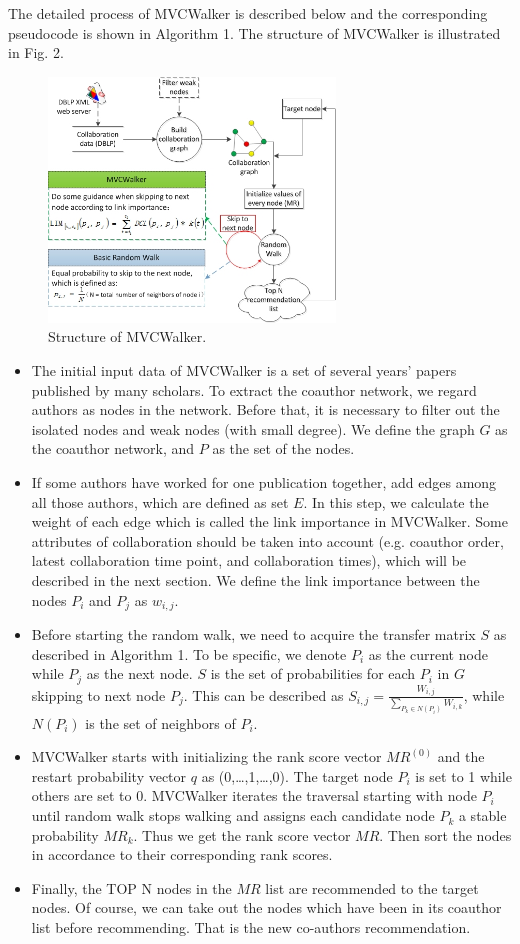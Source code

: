 \documentclass[10pt,journal,compsoc]{IEEEtran}
\begin{document}
The detailed process of MVCWalker is described below and the corresponding pseudocode is shown in Algorithm 1. The structure of MVCWalker is illustrated in Fig. 2.
\begin{figure}
\centering
\includegraphics [width=3in]{Fig2.jpg}
\caption{Structure of MVCWalker.}
\end{figure}
\begin{itemize}
\item The initial input data of MVCWalker is a set of several years' papers published by many scholars. To extract the coauthor network, we regard authors as nodes in the network. Before that, it is necessary to filter out the isolated nodes and weak nodes (with small degree). We define the graph $G$ as the coauthor network, and $P$ as the set of the nodes.
\item If some authors have worked for one publication together, add edges among all those authors, which are defined as set $E$. In this step, we calculate the weight of each edge which is called the link importance in MVCWalker. Some attributes of collaboration should be taken into account (e.g. coauthor order, latest collaboration time point, and collaboration times), which will be described in the next section. We define the link importance between the nodes $P_{i}$ and $P_{j}$ as $w_{i,j}$.
\item Before starting the random walk, we need to acquire the transfer matrix $S$ as described in Algorithm 1. To be specific, we denote $P_{i}$ as the current node while $P_{j}$ as the next node. $S$ is the set of probabilities for each $P_{i}$ in $G$ skipping to next node $P_{j}$. This can be described as $S_{i,j}=\frac{W_{i,j}}{\sum_{P_{k}\in N(P_{i})} W_{i,k}}$, while $N(P_{i})$ is the set of neighbors of $P_{i}$.
\item MVCWalker starts with initializing the rank score vector $MR^{(0)}$ and the restart probability vector $q$ as (0,\ldots,1,\ldots,0). The target node $P_{i}$ is set to 1 while others are set to 0. MVCWalker iterates the traversal starting with node $P_{i}$ until random walk stops walking and assigns each candidate node $P_{k}$ a stable probability $MR_{k}$. Thus we get the rank score vector $MR$. Then sort the nodes in accordance to their corresponding rank scores.
\item Finally, the TOP N nodes in the $MR$ list are recommended to the target nodes. Of course, we can take out the nodes which have been in its coauthor list before recommending. That is the new co-authors recommendation.
\end{itemize}
\end{document}
